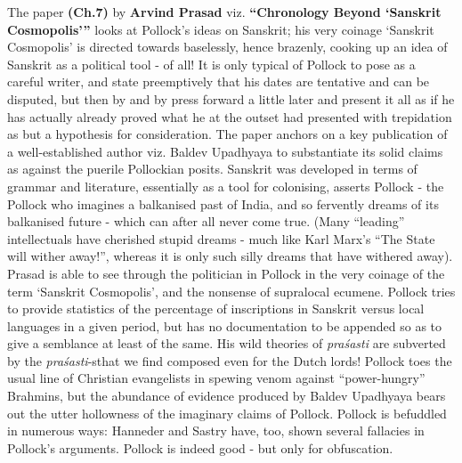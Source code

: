The paper \textbf{(Ch.7)} by \textbf{Arvind Prasad} viz. \textbf{“Chronology Beyond ‘Sanskrit Cosmopolis’”} looks at Pollock’s ideas on Sanskrit; his very coinage ‘Sanskrit Cosmopolis’ is directed towards baselessly, hence brazenly, cooking up an idea of Sanskrit as a political tool - of all! It is only typical of Pollock to pose as a careful writer, and state preemptively that his dates are tentative and can be disputed, but then by and by press forward a little later and present it all as if he has actually already proved what he at the outset had presented with trepidation as but a hypothesis for consideration. The paper anchors on a key publication of a well-established author viz. Baldev Upadhyaya to substantiate its solid claims as against the puerile Pollockian posits. Sanskrit was developed in terms of grammar and literature, essentially as a tool for colonising, asserts Pollock - the Pollock who imagines a balkanised past of India, and so fervently dreams of its balkanised future - which can after all never come true. (Many “leading” intellectuals have cherished stupid dreams - much like Karl Marx’s “The State will wither away!”, whereas it is only such silly dreams that have withered away). Prasad is able to see through the politician in Pollock in the very coinage of the term ‘Sanskrit Cosmopolis’, and the nonsense of supralocal ecumene. Pollock tries to provide statistics of the percentage of inscriptions in Sanskrit versus local languages in a given period, but has no documentation to be appended so as to give a semblance at least of the same. His wild theories of \textit{praśasti} are subverted by the \textit{praśasti}-s\break that we find composed even for the Dutch lords! Pollock toes the usual line of Christian evangelists in spewing venom against “power-hungry” Brahmins, but the abundance of evidence produced by Baldev Upadhyaya bears out the utter hollowness of the imaginary claims of Pollock. Pollock is befuddled in numerous ways: Hanneder and Sastry have, too, shown several fallacies in Pollock’s arguments. Pollock is indeed good - but only for obfuscation.

